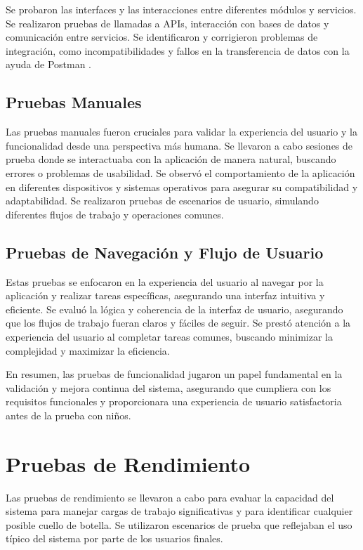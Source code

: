 Se probaron las interfaces y las interacciones entre diferentes módulos y servicios. Se realizaron pruebas de llamadas a APIs, interacción con bases de datos y comunicación entre servicios. Se identificaron y corrigieron problemas de integración, como incompatibilidades y fallos en la transferencia de datos con la ayuda de Postman \cite{postman}. 

\subsection{Pruebas Manuales}
Las pruebas manuales fueron cruciales para validar la experiencia del usuario y la funcionalidad desde una perspectiva más humana. Se llevaron a cabo sesiones de prueba donde se interactuaba con la aplicación de manera natural, buscando errores o problemas de usabilidad. Se observó el comportamiento de la aplicación en diferentes dispositivos y sistemas operativos para asegurar su compatibilidad y adaptabilidad. Se realizaron pruebas de escenarios de usuario, simulando diferentes flujos de trabajo y operaciones comunes.

\subsection{Pruebas de Navegación y Flujo de Usuario}

Estas pruebas se enfocaron en la experiencia del usuario al navegar por la aplicación y realizar tareas específicas, asegurando una interfaz intuitiva y eficiente. Se evaluó la lógica y coherencia de la interfaz de usuario, asegurando que los flujos de trabajo fueran claros y fáciles de seguir. Se prestó atención a la experiencia del usuario al completar tareas comunes, buscando minimizar la complejidad y maximizar la eficiencia.

En resumen, las pruebas de funcionalidad jugaron un papel fundamental en la validación y mejora continua del sistema, asegurando que cumpliera con los requisitos funcionales y proporcionara una experiencia de usuario satisfactoria antes de la prueba con niños.


\section{Pruebas de Rendimiento}

Las pruebas de rendimiento se llevaron a cabo para evaluar la capacidad del sistema para manejar cargas de trabajo significativas y para identificar cualquier posible cuello de botella. Se utilizaron escenarios de prueba que reflejaban el uso típico del sistema por parte de los usuarios finales.

